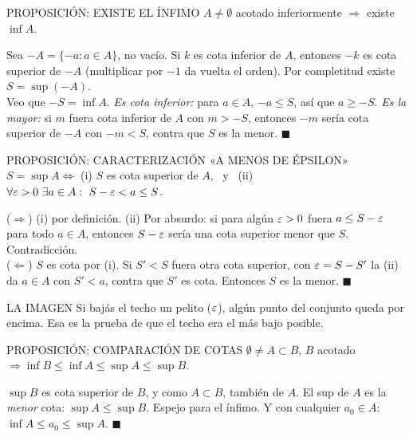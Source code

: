 \apuntes
\begin{sello}{PROPOSICIÓN: EXISTE EL ÍNFIMO}
$A\neq\emptyset$ acotado inferiormente $\Rightarrow$ existe $\inf A$.
\end{sello}
\begin{demo}
Sea $-A=\{-a:a\in A\}$, no vacío. Si $k$ es cota inferior de $A$, entonces $-k$ es cota superior de $-A$ (multiplicar por $-1$ da vuelta el orden). Por completitud existe $S=\sup(-A)$.\\
\agregado
Veo que $-S=\inf A$. \emph{Es cota inferior:} para $a\in A$, $-a\le S$, así que $a\ge-S$. \emph{Es la mayor:} si $m$ fuera cota inferior de $A$ con $m>-S$, entonces $-m$ sería cota superior de $-A$ con $-m<S$, contra que $S$ es la menor. $\blacksquare$
\end{demo}

\apuntes
\begin{sello}{PROPOSICIÓN: CARACTERIZACIÓN «A MENOS DE ÉPSILON»}
$S=\sup A\iff$ (i) $S$ es cota superior de $A$, \ y \ (ii) $\forall\eps>0\ \exists a\in A:\ S-\eps<a\le S$.
\end{sello}
\begin{demo}
($\Rightarrow$) (i) por definición. (ii) Por absurdo: si para algún $\varepsilon>0$ fuera $a\le S-\varepsilon$ para todo $a\in A$, entonces $S-\varepsilon$ sería una cota superior menor que $S$. Contradicción.\\[3pt]
($\Leftarrow$) $S$ es cota por (i). Si $S'<S$ fuera otra cota superior, con $\varepsilon=S-S'$ la (ii) da $a\in A$ con $S'<a$, contra que $S'$ es cota. Entonces $S$ es la menor. $\blacksquare$
\end{demo}
\begin{tip}{LA IMAGEN}
Si bajás el techo un pelito ($\varepsilon$), algún punto del conjunto queda por encima. Esa es la prueba de que el techo era el más bajo posible.
\end{tip}

\apuntes
\begin{sello}{PROPOSICIÓN: COMPARACIÓN DE COTAS}
$\emptyset\neq A\subset B$, $B$ acotado $\Rightarrow\inf B\le\inf A\le\sup A\le\sup B$.
\end{sello}
\agregado
\begin{demo}
$\sup B$ es cota superior de $B$, y como $A\subset B$, también de $A$. El sup de $A$ es la \emph{menor} cota: $\sup A\le\sup B$. Espejo para el ínfimo. Y con cualquier $a_0\in A$: $\inf A\le a_0\le\sup A$. $\blacksquare$
\end{demo}

